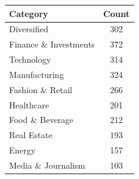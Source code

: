 \begin{tabular}{lc}
\toprule
Category & Count \\
\midrule
Diversified & 302 \\
Finance \& Investments & 372 \\
Technology & 314 \\
Manufacturing & 324 \\
Fashion \& Retail & 266 \\
Healthcare & 201 \\
Food \& Beverage & 212 \\
Real Estate & 193 \\
Energy & 157 \\
Media \& Journalism & 103 \\
\bottomrule
\end{tabular}